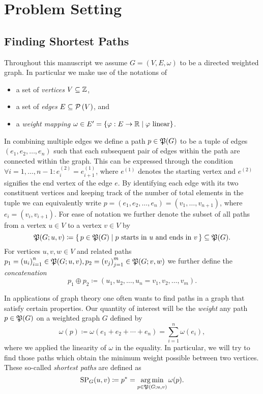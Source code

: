 \chapter{Problem Setting}

\section{Finding Shortest Paths}

Throughout this manuscript we assume $G = (V, E, \omega)$ to be a directed weighted graph.
In particular we make use of the notations of
\begin{itemize}
    \item a set of \emph{vertices} $V \subseteq \mathbb{Z}$,
    \item a set of \emph{edges} $E \subseteq \mathcal{P}\left(V\right)$, and
    \item a \emph{weight mapping} $\omega \in E' = \{ \varphi: E \rightarrow \mathbb{R} \mid \varphi \text{ linear} \}$.
\end{itemize}
In combining multiple edges we define a path $p \in \mathfrak{P}(G)$ to be a tuple of edges $(e_1, e_2, \dots, e_n)$ such that each subsequent pair of edges within the path are connected within the graph.
This can be expressed through the condition $\forall i = 1, \dots, n - 1: e_i^{(2)} = e_{i + 1}^{(1)}$, where $e^{(1)}$ denotes the starting vertex and $e^{(2)}$ signifies the end vertex of the edge $e$.
By identifying each edge with its two constituent vertices and keeping track of the number of total elements in the tuple we can equivalently write $p = (e_1, e_2, \dots, e_n) = (v_1, \dots, v_{n + 1})$, where $e_i = (v_i, v_{i + 1})$.
For ease of notation we further denote the subset of all paths from a vertex $u \in V$ to a vertex $v \in V$ by
\[
    \mathfrak{P}(G; u, v) \coloneqq \left\{\,p \in \mathfrak{P}(G)\mid\text{$p$ starts in $u$ and ends in $v$}\,\right\} \subseteq \mathfrak{P}(G).
\]
For vertices $u, v, w \in V$ and related paths $p_1 = {(u_i)}_{i = 1}^n \in \mathfrak{P}(G; u, v), p_2 = {(v_j)}_{j = 1}^m \in \mathfrak{P}(G; v, w)$ we further define the \emph{concatenation}
\[
    p_1 \oplus p_2 \coloneqq (u_1, u_2, \dots, u_n = v_1, v_2, \dots, v_m).
\]

In applications of graph theory one often wants to find paths in a graph that satisfy certain properties.
Our quantity of interest will be the \emph{weight} any path $p \in \mathfrak{P}(G)$ on a weighted graph $G$ defined by
\[
    \omega(p) \coloneqq \omega\left( e_1 + e_2 + \cdots + e_n \right) = \sum\limits_{i = 1}^n \omega(e_i),
\]
where we applied the linearity of $\omega$ in the equality.
In particular, we will try to find those paths which obtain the minimum weight possible between two vertices.
These so-called \emph{shortest paths} are defined as
\[
    \operatorname{SP}_G(u, v) \coloneqq p^* = \operatorname*{arg\,min}\limits_{p \in \mathfrak{P}(G; u, v)} \omega(p).
\]

